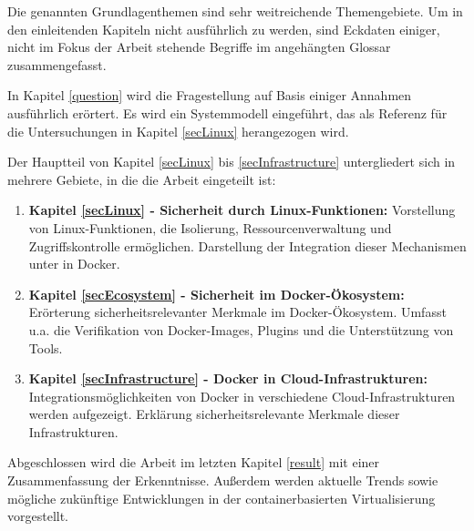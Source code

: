\documentclass[../main.tex]{subfiles}
\begin{document}
    Die genannten Grundlagenthemen sind sehr weitreichende Themengebiete. Um in den einleitenden Kapiteln nicht ausführlich zu werden, sind Eckdaten einiger, nicht im Fokus der Arbeit stehende Begriffe im angehängten Glossar zusammengefasst.

    In Kapitel \ref{question} wird die Fragestellung auf Basis einiger Annahmen ausführlich erörtert. Es wird ein Systemmodell eingeführt, das als Referenz für die Untersuchungen in Kapitel \ref{secLinux} herangezogen wird.

    Der Hauptteil von Kapitel \ref{secLinux} bis \ref{secInfrastructure} untergliedert sich in mehrere Gebiete, in die die Arbeit eingeteilt ist:
    \begin{enumerate}
      \item \textbf{Kapitel \ref{secLinux} - Sicherheit durch Linux-Funktionen:} Vorstellung von Linux-Funktionen, die Isolierung, Ressourcenverwaltung und Zugriffskontrolle ermöglichen. Darstellung der Integration dieser Mechanismen unter in Docker.
      \item \textbf{Kapitel \ref{secEcosystem} - Sicherheit im Docker-Ökosystem:} Erörterung sicherheitsrelevanter Merkmale im Docker-Ökosystem. Umfasst u.a. die Verifikation von Docker-Images, Plugins und die Unterstützung von Tools.
      \item \textbf{Kapitel \ref{secInfrastructure} - Docker in Cloud-Infrastrukturen:} Integrationsmöglichkeiten von Docker in verschiedene Cloud-Infrastrukturen werden aufgezeigt. Erklärung sicherheitsrelevante Merkmale dieser Infrastrukturen.
    \end{enumerate}

    Abgeschlossen wird die Arbeit im letzten Kapitel \ref{result} mit einer Zusammenfassung der Erkenntnisse. Außerdem werden aktuelle Trends sowie mögliche zukünftige Entwicklungen in der containerbasierten Virtualisierung vorgestellt.
\end{document}

